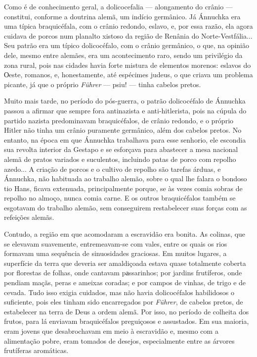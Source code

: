 Como é de conhecimento geral, a dolicocefalia --- alongamento do crânio
--- constitui, conforme a doutrina alemã, um indício germânico. Já
Ánnuchka era uma típica braquicéfala, com o crânio redondo, eslavo, e,
por essa razão, ela agora cuidava de porcos num planalto xistoso da
região de Renânia do Norte-Vestfália... Seu patrão era um típico
dolicocéfalo, com o crânio germânico, o que, na opinião dele, mesmo
entre alemães, era um acontecimento raro, sendo um privilégio da zona
rural, pois nas cidades havia forte mistura de elementos morenos:
eslavos do Оeste, romanos, e, honestamente, até espécimes judeus, o que
criava um problema picante, já que o próprio \emph{Führer} --- psiu! ---
tinha cabelos pretos.

Muito mais tarde, no período do pós-guerra, o patrão dolicocéfalo de
Ánnuchka passou a afirmar que sempre fora antinazista e anti-hitlerista,
pois na cúpula do partido nazista predominavam braquicéfalos, de crânio
redondo, e o próprio Hitler não tinha um crânio puramente germânico,
além dos cabelos pretos. No entanto, na época em que Ánnuchka trabalhava
para esse senhorio, ele escondia sua revolta interior da Gestapo e se
esforçava para abastecer a mesa nacional alemã de pratos variados e
suculentos, incluindo patas de porco com repolho azedo... A criação de
porcos e o cultivo de repolho são tarefas árduas, e Ánnuchka, não
habituada ao trabalho alemão, sobre o qual lhe falara o bondoso tio
Hans, ficava extenuada, principalmente porque, se às vezes comia sobras
de repolho no almoço, nunca comia carne. E os outros braquicéfalos
também se esgotavam do trabalho alemão, sem conseguirem restabelecer
suas forças com as refeições alemãs.

Contudo, a região em que acomodaram a escravidão era bonita. As colinas,
que se elevavam suavemente, entremeavam-se com vales, entre os quais os
rios formavam uma sequência de sinuosidades graciosas. Em muitos
lugares, a superfície da terra que deveria ser amaldiçoada estava quase
totalmente coberta por florestas de folhas, onde cantavam pаssarinhos;
por jardins frutíferos, onde pendiam maçãs, peras e ameixas coradas; e
por campos de vinhas, de trigo e de cevada. Tudo isso exigia cuidados,
mas não havia dolicocéfalos habilidosos o suficiente, pois eles tinham
sido encarregados por \emph{Führer}, de cabelos pretos, de estabelecer
na terra de Deus a ordem alemã. Por isso, no período de colheita dos
frutos, para lá enviavam braquicéfalos preguiçosos e assustados. Em sua
maioria, eram jovens que desabrochavam em meio à escravidão e, mesmo com
a alimentação pobre, eram tomados de desejos, especialmente entre as
árvores frutíferas aromáticas.

